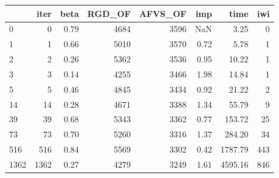 \begin{tabular}{lrrrrrrr}
\toprule
{} &  iter &  beta &  RGD\_OF &  AFVS\_OF &  imp &    time &  iwi \\
\midrule
0    &     0 &  0.79 &    4684 &     3596 &  NaN &    3.25 &    0 \\
1    &     1 &  0.66 &    5010 &     3570 & 0.72 &    5.78 &    1 \\
2    &     2 &  0.26 &    5362 &     3536 & 0.95 &   10.22 &    1 \\
3    &     3 &  0.14 &    4255 &     3466 & 1.98 &   14.84 &    1 \\
5    &     5 &  0.46 &    4845 &     3434 & 0.92 &   21.22 &    2 \\
14   &    14 &  0.28 &    4671 &     3388 & 1.34 &   55.79 &    9 \\
39   &    39 &  0.68 &    5343 &     3362 & 0.77 &  153.72 &   25 \\
73   &    73 &  0.70 &    5260 &     3316 & 1.37 &  284.20 &   34 \\
516  &   516 &  0.84 &    5569 &     3302 & 0.42 & 1787.79 &  443 \\
1362 &  1362 &  0.27 &    4279 &     3249 & 1.61 & 4595.16 &  846 \\
\bottomrule
\end{tabular}
